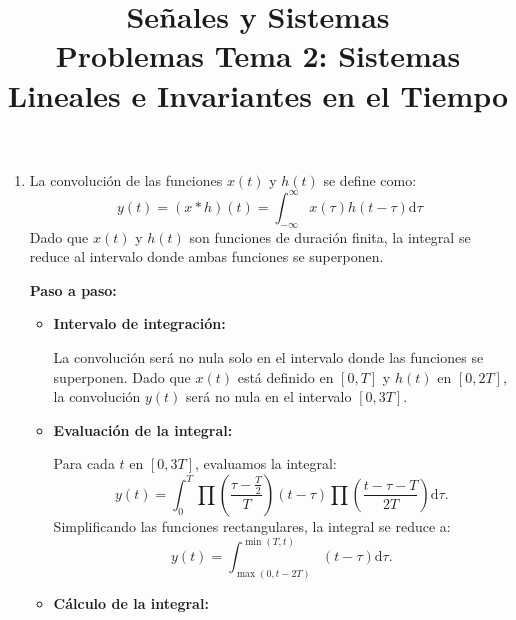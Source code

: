 
\title{Señales y Sistemas\\Problemas Tema 2: Sistemas Lineales e Invariantes en el Tiempo}


\maketitle
\begin{enumerate}[label=\color{red}\textbf{\arabic*)}]
  \item {}

    La convolución de las funciones $x(t)$ y $h(t)$ se define como: \[
      y(t)=(x\ast h)(t)=\int_{-\infty}^{\infty} x(\tau) h(t-\tau)\mathrm{d}\tau
    \] 
    Dado que $x(t)$ y  $h(t)$ son funciones de duración finita, la integral se reduce al intervalo donde ambas funciones se superponen.

     \textbf{Paso a paso:}
     \begin{itemize}[label=\textbullet]
       \item \textbf{Intervalo de integración:}

         La convolución será no nula solo en el intervalo donde las funciones se superponen. Dado que $x(t)$ está definido en  $[0,T]$ y  $h(t)$ en  $[0,2T]$, la convolución  $y(t)$ será no nula en el intervalo $[0,3T]$.
       \item  \textbf{Evaluación de la integral:}

         Para cada $t$ en  $[0,3T]$, evaluamos la integral:  \[
           y(t)=\int_{0}^{T} \prod\left( \dfrac{\tau-\frac{T}{2}}{T} \right)  (t-\tau)\prod\left( \dfrac{t-\tau-T}{2T} \right) \mathrm{d}\tau.
         \] 
         Simplificando las funciones rectangulares, la integral se reduce a: \[
         y(t)=\int_{\max(0,t-2T)}^{\min(T,t)}(t-\tau)\mathrm{d}\tau.
         \] 
       \item \textbf{Cálculo de la integral:}


\end{itemize}
\end{enumerate}
